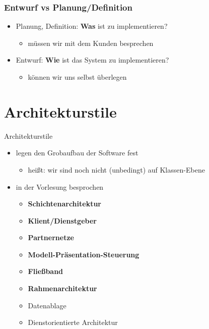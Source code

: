 \documentclass[18pt]{beamer}
\begin{document}
		\begin{frame}
			\frametitle{Entwurf vs Planung/Definition}
			\begin{itemize}
				\item Planung, Definition: \textbf{Was} ist zu implementieren?
				\begin{itemize}
					\item müssen wir mit dem Kunden besprechen
				\end{itemize}
				\pause
				\item Entwurf: \textbf{Wie} ist das System zu implementieren?
				\begin{itemize}
					\item können wir uns selbst überlegen
				\end{itemize}
			\end{itemize}
		\end{frame}
	
\section{Architekturstile}
	\begin{frame}{Architekturstile}
		\begin{itemize}
			\item legen den Grobaufbau der Software fest
			\begin{itemize}
				\item heißt: wir sind noch nicht (unbedingt) auf Klassen-Ebene 
			\end{itemize}
			\item in der Vorlesung besprochen
			\begin{itemize}
				\item \textbf{Schichtenarchitektur}
				\item \textbf{Klient/Dienstgeber} 
				\item \textbf{Partnernetze}
				\item \textbf{Modell-Präsentation-Steuerung}
				\item \textbf{Fließband}
				\item \textbf{Rahmenarchitektur}
				\item Datenablage
				\item Dienstorientierte Architektur
			\end{itemize}
		\end{itemize}
	\end{frame}
\end{document}
